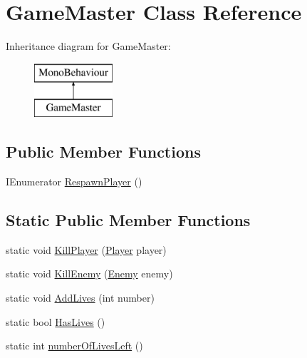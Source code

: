 \hypertarget{class_game_master}{}\section{Game\+Master Class Reference}
\label{class_game_master}
Inheritance diagram for Game\+Master\+:\begin{figure}[H]
\begin{center}
\leavevmode
\includegraphics[height=2.000000cm]{class_game_master}
\end{center}
\end{figure}
\subsection*{Public Member Functions}
\begin{DoxyCompactItemize}
\item 
I\+Enumerator \hyperlink{class_game_master_a77c6806b751ee10f5bf89b55573a7dda}{Respawn\+Player} ()
\end{DoxyCompactItemize}
\subsection*{Static Public Member Functions}
\begin{DoxyCompactItemize}
\item 
static void \hyperlink{class_game_master_a21f46b5da1508cdbde26212cbd0708b3}{Kill\+Player} (\hyperlink{class_player}{Player} player)
\item 
static void \hyperlink{class_game_master_a87feaa0e8f190a7bb92243f1ce1afafc}{Kill\+Enemy} (\hyperlink{class_enemy}{Enemy} enemy)
\item 
static void \hyperlink{class_game_master_a7f822971393cd0a76ffc4c09760223f7}{Add\+Lives} (int number)
\item 
static bool \hyperlink{class_game_master_adcf885b9e651320765edfee712e7b7a1}{Has\+Lives} ()
\item 
static int \hyperlink{class_game_master_aad339a3d782e271ab40c7dd28cef8d85}{number\+Of\+Lives\+Left} ()
\end{DoxyCompactItemize}
